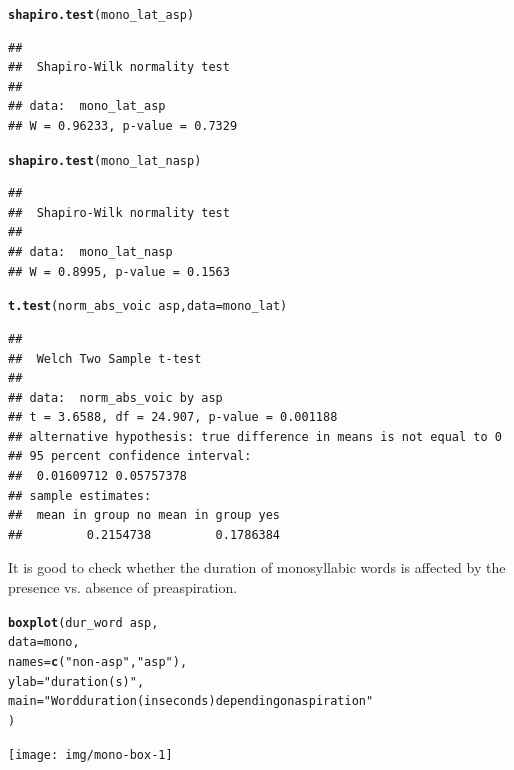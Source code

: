 \documentclass[a4paper,11pt]{article}\usepackage[]{graphicx}\usepackage[]{color}
\makeatletter
\newcommand{\hlstr}[1]{\textcolor[rgb]{0.192,0.494,0.8}{#1}}%
\newcommand{\hlopt}[1]{\textcolor[rgb]{0,0,0}{#1}}%
\newcommand{\hlstd}[1]{\textcolor[rgb]{0.345,0.345,0.345}{#1}}%
\newcommand{\hlkwc}[1]{\textcolor[rgb]{0.333,0.667,0.333}{#1}}%
\newcommand{\hlkwd}[1]{\textcolor[rgb]{0.737,0.353,0.396}{\textbf{#1}}}%
\newenvironment{kframe}{%
 \def\at@end@of@kframe{}%
 \ifinner\ifhmode%
  \def\at@end@of@kframe{\end{minipage}}%
  \begin{minipage}{\columnwidth}%
 \fi\fi%
 \def\FrameCommand##1{\hskip\@totalleftmargin \hskip-\fboxsep
 \colorbox{shadecolor}{##1}\hskip-\fboxsep
     \hskip-\linewidth \hskip-\@totalleftmargin \hskip\columnwidth}%
 \MakeFramed {\advance\hsize-\width
   \@totalleftmargin\z@ \linewidth\hsize
   \@setminipage}}%
 {\par\unskip\endMakeFramed%
 \at@end@of@kframe}
\newenvironment{knitrout}{}{} %
\makeatother
\begin{document}
\begin{knitrout}
\color{fgcolor}\begin{kframe}
\begin{alltt}
\hlkwd{shapiro.test}\hlstd{(mono_lat_asp)}
\end{alltt}
\begin{verbatim}
## 
## 	Shapiro-Wilk normality test
## 
## data:  mono_lat_asp
## W = 0.96233, p-value = 0.7329
\end{verbatim}
\begin{alltt}
\hlkwd{shapiro.test}\hlstd{(mono_lat_nasp)}
\end{alltt}
\begin{verbatim}
## 
## 	Shapiro-Wilk normality test
## 
## data:  mono_lat_nasp
## W = 0.8995, p-value = 0.1563
\end{verbatim}
\begin{alltt}
\hlkwd{t.test}\hlstd{(norm_abs_voic} \hlopt{~} \hlstd{asp,} \hlkwc{data} \hlstd{= mono_lat)}
\end{alltt}
\begin{verbatim}
## 
## 	Welch Two Sample t-test
## 
## data:  norm_abs_voic by asp
## t = 3.6588, df = 24.907, p-value = 0.001188
## alternative hypothesis: true difference in means is not equal to 0
## 95 percent confidence interval:
##  0.01609712 0.05757378
## sample estimates:
##  mean in group no mean in group yes 
##         0.2154738         0.1786384
\end{verbatim}
\end{kframe}
\end{knitrout}

It is good to check whether the duration of monosyllabic words is affected by the presence vs. absence of preaspiration.

\begin{knitrout}
\color{fgcolor}\begin{kframe}
\begin{alltt}
\hlkwd{boxplot}\hlstd{(dur_word} \hlopt{~} \hlstd{asp,}
        \hlkwc{data} \hlstd{= mono,}
        \hlkwc{names} \hlstd{=} \hlkwd{c}\hlstd{(}\hlstr{"non-asp"}\hlstd{,} \hlstr{"asp"}\hlstd{),}
        \hlkwc{ylab} \hlstd{=} \hlstr{"duration (s)"}\hlstd{,}
        \hlkwc{main} \hlstd{=} \hlstr{"Word duration (in seconds) depending on aspiration"}
        \hlstd{)}
\end{alltt}
\end{kframe}

{\centering \texttt{[image: img/mono-box-1]} 

}



\end{knitrout}
\end{document}
